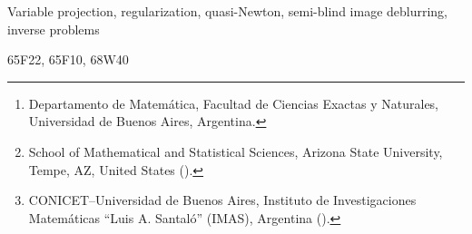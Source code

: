 \documentclass[onefignum,onetabnum]{siamart171218}
\title{{\TheTitle}}
\author{
Delfina B. Comerso Salzer\thanks{Departamento de Matem\'atica, Facultad de Ciencias Exactas y Naturales, Universidad de Buenos Aires, Argentina.}
\and
Malena I. Espa\~nol\thanks{School of Mathematical and Statistical Sciences, Arizona State University, Tempe, AZ, United States (\email{malena.espanol@asu.edu}).}
\and
Gabriela Jeronimo\thanks{CONICET–Universidad de Buenos Aires, Instituto de Investigaciones Matem\'aticas ``Luis A. Santal\'o'' (IMAS), Argentina (\email{jeronimo@dm.uba.ar}).}
}
\begin{document}
\maketitle


\begin{abstract} Separable nonlinear least squares problems appear in many inverse problems, including semi-blind image deblurring. The variable projection (VarPro) method provides an efficient approach for solving such problems by eliminating linear variables and reducing the problem to a smaller, nonlinear one. In this work, we extend VarPro to solve minimization problems containing a differentiable regularization term on the nonlinear parameters, along with a general-form Tikhonov regularization term on the linear variables. Furthermore, we develop a quasi-Newton method for solving the resulting reduced problem, and provide a local convergence analysis under standard smoothness assumptions, establishing conditions for superlinear or quadratic convergence. For large-scale settings, we introduce an inexact LSQR-based variant and prove its local convergence despite inner-solve and Hessian approximations. Numerical experiments on semi-blind deblurring show that parameter regularization prevents degenerate no-blur solutions and that the proposed methods achieve accurate reconstructions, with the inexact variant offering a favorable accuracy-cost tradeoff consistent with the theory. 

\end{abstract}

\begin{keywords} Variable projection, regularization, quasi-Newton, semi-blind image deblurring, inverse problems
\end{keywords}

\begin{AMS} 65F22, 65F10, 68W40
\end{AMS}
\end{document}
